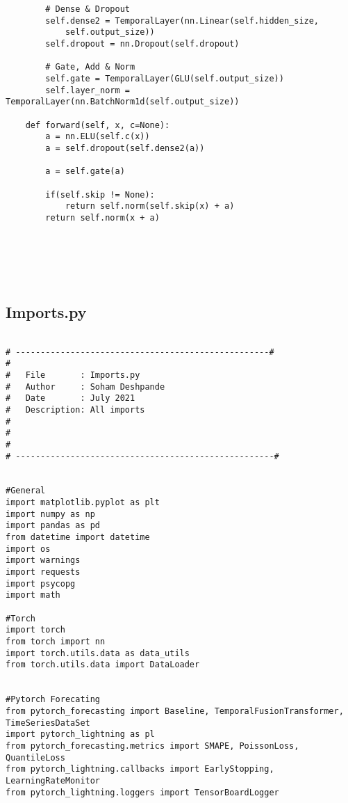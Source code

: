 \documentclass{article}
\begin{document}
\begin{lstlisting}
        # Dense & Dropout
        self.dense2 = TemporalLayer(nn.Linear(self.hidden_size,
            self.output_size))
        self.dropout = nn.Dropout(self.dropout)

        # Gate, Add & Norm
        self.gate = TemporalLayer(GLU(self.output_size))
        self.layer_norm = TemporalLayer(nn.BatchNorm1d(self.output_size))

    def forward(self, x, c=None):
        a = nn.ELU(self.c(x))
        a = self.dropout(self.dense2(a))

        a = self.gate(a)

        if(self.skip != None):
            return self.norm(self.skip(x) + a)
        return self.norm(x + a)






\end{lstlisting}

\clearpage

\subsection{Imports.py}
\begin{lstlisting}

# ---------------------------------------------------#
#
#   File       : Imports.py
#   Author     : Soham Deshpande
#   Date       : July 2021
#   Description: All imports
#
#
#
# ----------------------------------------------------#


#General
import matplotlib.pyplot as plt
import numpy as np
import pandas as pd
from datetime import datetime
import os
import warnings
import requests
import psycopg
import math

#Torch
import torch
from torch import nn
import torch.utils.data as data_utils
from torch.utils.data import DataLoader


#Pytorch Forecating
from pytorch_forecasting import Baseline, TemporalFusionTransformer, TimeSeriesDataSet
import pytorch_lightning as pl
from pytorch_forecasting.metrics import SMAPE, PoissonLoss, QuantileLoss
from pytorch_lightning.callbacks import EarlyStopping, LearningRateMonitor
from pytorch_lightning.loggers import TensorBoardLogger





\end{lstlisting}

\clearpage
\end{document}

